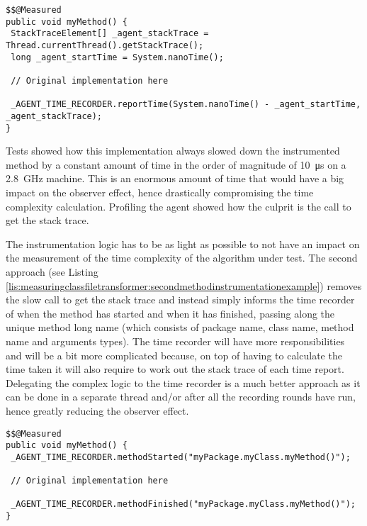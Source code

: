 \begin{lstlisting}[breaklines,caption={Method instrumentation example (first approach)},label=lis:measuringclassfiletransformer:firstmethodinstrumentationexample]
$$@Measured
public void myMethod() {
 StackTraceElement[] _agent_stackTrace = Thread.currentThread().getStackTrace();
 long _agent_startTime = System.nanoTime();

 // Original implementation here

 _AGENT_TIME_RECORDER.reportTime(System.nanoTime() - _agent_startTime, _agent_stackTrace);
}
\end{lstlisting}

\noindent Tests showed how this implementation always slowed down the instrumented method by a constant amount of time in the order of magnitude of \SI{10}{\micro\second} on a \SI{2.8}{\giga\hertz} machine. This is an enormous amount of time that would have a big impact on the observer effect, hence drastically compromising the time complexity calculation. Profiling the agent showed how the culprit is the call to get the stack trace.

\noindent The instrumentation logic has to be as light as possible to not have an impact on the measurement of the time complexity of the algorithm under test. The second approach (see Listing \ref{lis:measuringclassfiletransformer:secondmethodinstrumentationexample}) removes the slow call to get the stack trace and instead simply informs the time recorder of when the method has started and when it has finished, passing along the unique method long name (which consists of package name, class name, method name and arguments types). The time recorder will have more responsibilities and will be a bit more complicated because, on top of having to calculate the time taken it will also require to work out the stack trace of each time report. Delegating the complex logic to the time recorder is a much better approach as it can be done in a separate thread and/or after all the recording rounds have run, hence greatly reducing the observer effect.

\begin{lstlisting}[breaklines,caption={Method instrumentation example (second approach)},label=lis:measuringclassfiletransformer:secondmethodinstrumentationexample]
$$@Measured
public void myMethod() {
 _AGENT_TIME_RECORDER.methodStarted("myPackage.myClass.myMethod()");

 // Original implementation here

 _AGENT_TIME_RECORDER.methodFinished("myPackage.myClass.myMethod()");
}
\end{lstlisting}


